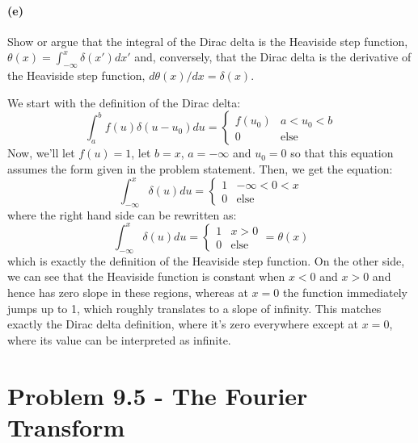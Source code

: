 \documentclass{article}
\begin{document}
\paragraph{(e)}
Show or argue that the integral of the Dirac delta is the Heaviside step function, $\theta(x) = \int_{-\infty}^{x} \delta(x')dx'$ and, conversely, that
the Dirac delta is the derivative of the Heaviside step function, $d\theta(x)/dx = \delta(x)$.

\begin{solution}
	We start with the definition of the Dirac delta:
	\[
		\int_a^b f(u) \delta(u - u_0) du = \begin{cases} f(u_0) & a < u_0 < b\\
		0 & \text{else}\end{cases}
	\] 
	Now, we'll let $f(u) = 1$, let $b = x$, $a = -\infty$ and $u_0 = 0$ so that this equation 
	assumes the form given in the problem statement. Then, we get the equation:
	\[
		\int_{-\infty}^x \delta(u) du = \begin{cases}
			1 & -\infty < 0 < x\\
			0 & \text{else}
		\end{cases}
	\] 
	where the right hand side can be rewritten as:
	\[
		\int_{-\infty}^x \delta(u) du = \begin{cases}
			1 &		x > 0\\
			0 & \text{else}
		\end{cases} = \theta(x)
	\] 
	which is exactly the definition of the Heaviside step function. On the other side, we can see that the 
	Heaviside function is constant when $x < 0$ and $x > 0$ and hence has zero slope in these regions, 
	whereas at $x=0$ the function immediately jumps up to 1, which roughly translates to a slope of infinity. 
	This matches exactly the Dirac delta definition, where it's zero everywhere except at $x=0$, where
	its value can be interpreted as infinite.
\end{solution}


\bigskip
\dphline
\pagebreak
\section*{Problem 9.5 - The Fourier Transform}
\end{document}
